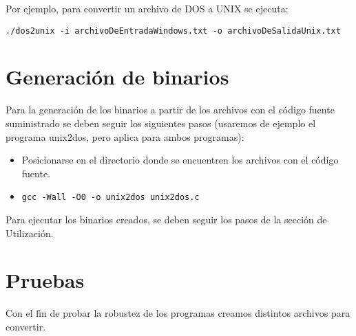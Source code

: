 \documentclass[a4paper,11pt]{article}
\begin{document}
\indent	
Por ejemplo, para convertir un archivo de DOS a UNIX se ejecuta: 

\begin{verbatim}
./dos2unix -i archivoDeEntradaWindows.txt -o archivoDeSalidaUnix.txt
\end{verbatim}

\section{Generaci\'on de binarios}
Para la generaci\'on de los binarios a partir de los archivos con el c\'odigo fuente suministrado se deben seguir los siguientes pasos (usaremos de ejemplo el programa unix2dos, pero aplica para ambos programas):

\begin{itemize}
\item Posicionarse en el directorio donde se encuentren los archivos con el c\'odigo fuente.
\item \begin{verbatim}
gcc -Wall -O0 -o unix2dos unix2dos.c
\end{verbatim} 
\end{itemize}

Para ejecutar los binarios creados, se deben seguir los pasos de la secci\'on de Utilizaci\'on.

\section{Pruebas}
Con el fin de probar la robustez de los programas creamos distintos archivos para convertir.
\end{document}
